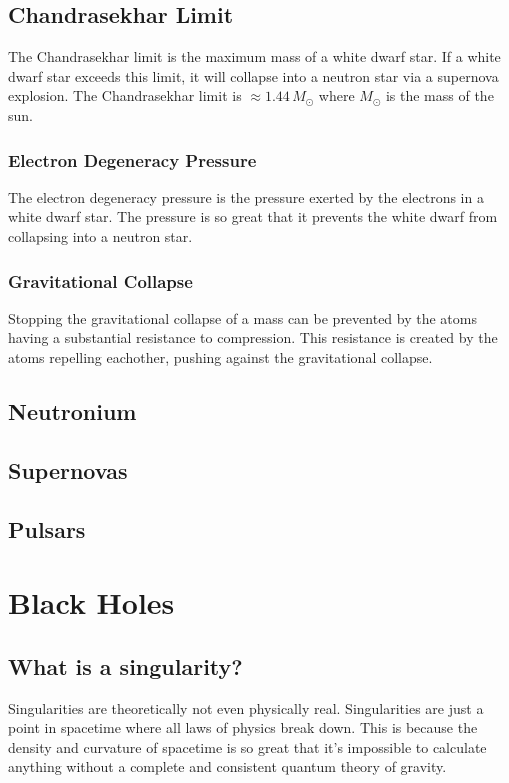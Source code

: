 \documentclass{article}
\begin{document}
\subsection{Chandrasekhar Limit}
The Chandrasekhar limit is the maximum mass of a white dwarf star. If a white dwarf star exceeds this limit, it will collapse into a neutron star via a supernova explosion. The Chandrasekhar limit is $\approx 1.44\,M_{\odot}$ where $M_{\odot}$ is the mass of the sun.

\subsubsection{Electron Degeneracy Pressure}\label{sec:electron_degeneracy_pressure}
The electron degeneracy pressure is the pressure exerted by the electrons in a white dwarf star. The pressure is so great that it prevents the white dwarf from collapsing into a neutron star.

\subsubsection{Gravitational Collapse}
Stopping the gravitational collapse of a mass can be prevented by the atoms having a substantial resistance to compression. This resistance is created by the atoms repelling eachother, pushing against the gravitational collapse.

\subsection{Neutronium}


\subsection{Supernovas}


\subsection{Pulsars}



\section{Black Holes}
\subsection{What is a singularity?}
Singularities are theoretically not even physically real. Singularities are just a point in spacetime where all laws of physics break down. This is because the density and curvature of spacetime is so great that it's impossible to calculate anything without a complete and consistent quantum theory of gravity.
\end{document}
